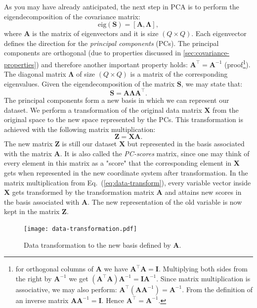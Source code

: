 \documentclass[10pt,twocolumn]{article}
\begin{document}
As you may have already anticipated, the next step in PCA is to perform the eigendecomposition of the covariance matrix:
\begin{equation} \label{eq:eig-dec}
\text{eig}(\mathbf{S}) = [\mathbf{A}, \mathbf{\Lambda}],
\end{equation}
where $\mathbf{A}$ is the matrix of eigenvectors and it is size $(Q \times Q)$. Each eigenvector defines the direction for the \textit{principal components} (PCs). The principal components are orthogonal (due to properties discussed in \ref{sec:covariance-properties}) and therefore another important property holds: $\mathbf{A}^{\top} = \mathbf{A}^{-1}$ (proof\footnote{for orthogonal columns of $\mathbf{A}$ we have $\mathbf{A}^{\top} \mathbf{A} = \mathbf{I}$. Multiplying both sides from the right by $ \mathbf{A}^{-1}$ we get $(\mathbf{A}^{\top} \mathbf{A}) \mathbf{A}^{-1}= \mathbf{I}\mathbf{A}^{-1}$. Since matrix multiplication is associative, we may also perform: $\mathbf{A}^{\top} (\mathbf{A} \mathbf{A}^{-1}) = \mathbf{A}^{-1}$. From the definition of an inverse matrix $\mathbf{A} \mathbf{A}^{-1} = \mathbf{I}$. Hence $\mathbf{A}^{\top} = \mathbf{A}^{-1}$.}).
The diagonal matrix $\mathbf{\Lambda}$ of size $(Q \times Q)$ is a matrix of the corresponding eigenvalues. Given the eigendecomposition of the matrix $\mathbf{S}$, we may state that: 
\begin{equation} \label{eq:eig-dec-cov-matrix}
\mathbf{S} = \mathbf{A} \mathbf{\Lambda} \mathbf{A}^{\top}.
\end{equation}
The principal components form a new basis in which we can represent our dataset. We perform a transformation of the original data matrix $\mathbf{X}$ from the original space to the new space represented by the PCs. This transformation is achieved with the following matrix multiplication:
\begin{equation} \label{eq:data-transform}
\mathbf{Z} = \mathbf{X} \mathbf{A}.
\end{equation}
The new matrix $\mathbf{Z}$ is still our dataset $\mathbf{X}$ but represented in the basis associated with the matrix $\mathbf{A}$. It is also called the \textit{PC-scores} matrix, since one may think of every element in this matrix as a "score" that the corresponding element in $\mathbf{X}$ gets when represented in the new coordinate system after transformation. In the matrix multiplication from Eq.~(\ref{eq:data-transform}), every variable vector inside $\mathbf{X}$ gets transformed by the transformation matrix $\mathbf{A}$ and attains new scores in the basis associated with $\mathbf{A}$. The new representation of the old variable is now kept in the matrix $\mathbf{Z}$.
\begin{figure}[t]
\centering\texttt{[image: data-transformation.pdf]}
\caption{Data transformation to the new basis defined by $\mathbf{A}$.}
\label{fig:data-transformation}
\end{figure}
\end{document}
